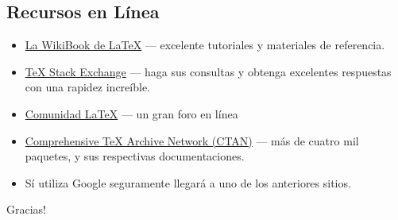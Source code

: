 \documentclass{beamer}
\begin{document}
\subsection{Recursos en Línea}
\begin{frame}{\insertsubsection}
  \begin{itemize}
  \item \href{http://en.wikibooks.org/wiki/LaTeX}{La WikiBook de
      \LaTeX{}} --- excelente tutoriales y materiales de referencia.
  \item \href{http://tex.stackexchange.com/}{\TeX{} Stack Exchange} ---
    haga sus consultas y obtenga excelentes respuestas con una rapidez
    increíble.
  \item \href{http://www.latex-community.org/}{Comunidad \LaTeX{}} ---
    un gran foro en línea
  \item \href{http://ctan.org/}{Comprehensive \TeX{} Archive Network (CTAN)} ---
    más de cuatro mil paquetes, y sus respectivas documentaciones.
  \item Sí utiliza Google seguramente llegará  a uno de los anteriores sitios.
  \end{itemize}
\end{frame}

\begin{frame}
  \begin{center}
    Gracias!
  \end{center}
\end{frame}
\end{document}
